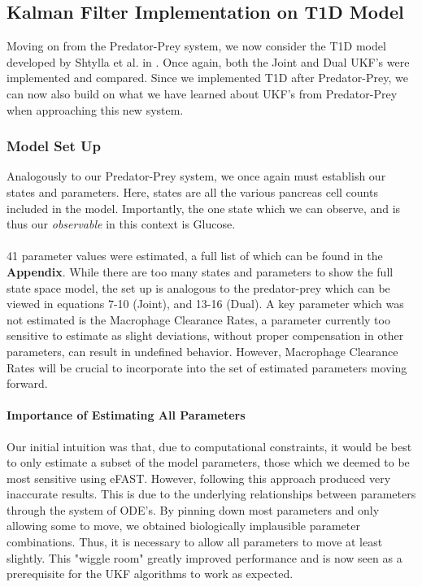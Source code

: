 \subsection{Kalman Filter Implementation on T1D Model} \label{section:UKF_T1D_Implementation}
Moving on from the Predator-Prey system, we now consider the T1D model developed by Shtylla et al. in \cite{shtylla2019mathematical}. Once again, both the Joint and Dual UKF's were implemented and compared. Since we implemented T1D after Predator-Prey, we can now also build on what we have learned about UKF's from Predator-Prey when approaching this new system.

\subsubsection{Model Set Up}
Analogously to our Predator-Prey system, we once again must establish our states and parameters. Here, states are all the various pancreas cell counts included in the model. Importantly, the one state which we can observe, and is thus our \emph{observable} in this context is Glucose. \\
\\
41 parameter values were estimated, a full list of which can be found in the \textbf{Appendix}. While there are too many states and parameters to show the full state space model, the set up is analogous to the predator-prey which can be viewed in equations 7-10 (Joint), and 13-16 (Dual). A key parameter which was not estimated is the Macrophage Clearance Rates, a parameter currently too sensitive to estimate as slight deviations, without proper compensation in other parameters, can result in undefined behavior. However, Macrophage Clearance Rates will be crucial to incorporate into the set of estimated parameters moving forward.

\paragraph{Importance of Estimating All Parameters}
Our initial intuition was that, due to computational constraints, it would be best to only estimate a subset of the model parameters, those which we deemed to be most sensitive using eFAST. However, following this approach produced very inaccurate results. This is due to the underlying relationships between parameters through the system of ODE's. By pinning down most parameters and only allowing some to move, we obtained biologically implausible parameter combinations. Thus, it is necessary to allow all parameters to move at least slightly. This "wiggle room" greatly improved performance and is now seen as a prerequisite for the UKF algorithms to work as expected.


